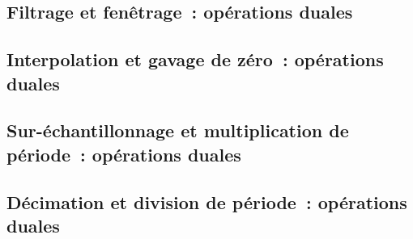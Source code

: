 \subsection{Filtrage et fenêtrage~: opérations duales}

\subsection{Interpolation et gavage de zéro~: opérations duales}

\subsection{Sur-échantillonnage et multiplication de période~:
  opérations duales}

\subsection{Décimation et division de période~: opérations duales}

